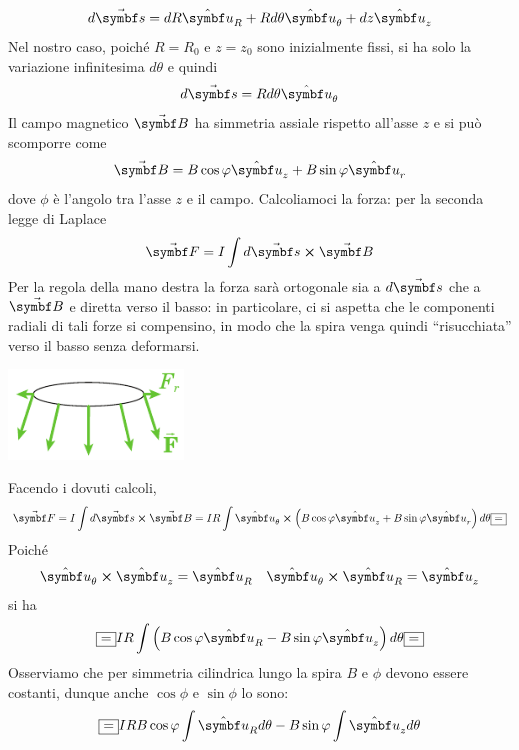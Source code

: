 \begin{equation}
	d\vba{s}=dR\vbh{u}_R+Rd\theta\vbh{u}_\theta+dz\vbh{u}_z
\end{equation}
Nel nostro caso, poiché $R=R_0$ e $z=z_0$ sono inizialmente fissi, si ha solo la variazione infinitesima $d\theta$ e quindi
\begin{equation}
	d\vba{s}=Rd\theta\vbh{u}_\theta
\end{equation}
Il campo magnetico $\vba{B}$ ha simmetria assiale rispetto all'asse $z$ e si può scomporre come
\begin{equation}
	\vba{B}=B\cos\phi\vbh{u}_z+B\sin\phi\vbh{u}_r
\end{equation}
dove $\phi$ è l'angolo tra l'asse $z$ e il campo. Calcoliamoci la forza: per la seconda legge di Laplace
\begin{equation*}
	\vba{F}=I\int d\vba{s}\cross\vba{B}
\end{equation*}
Per la regola della mano destra la forza sarà ortogonale sia a $d\vba{s}$ che a $\vba{B}$ e diretta verso il basso: in particolare, ci si aspetta che le componenti radiali di tali forze si compensino, in modo che la spira venga quindi ``risucchiata'' verso il basso senza deformarsi.
\begin{center}
	\includegraphics[width=0.35\textwidth]{images/chp8/chp8magnetecilindrico2.pdf}
\end{center}
Facendo i dovuti calcoli,
\begin{equation*}
	\vba{F}=I\int d\vba{s}\cross\vba{B}=IR\int\vbh{u}_{\theta}\cross\left(B\cos\phi\vbh{u}_z+B\sin\phi\vbh{u}_r\right)d\theta\squarequal
\end{equation*}
Poiché
\begin{align*}
	\vbh{u}_{\theta}\cross\vbh{u}_{z}=\vbh{u}_R&&
	\vbh{u}_{\theta}\cross\vbh{u}_{R}=\vbh{u}_z
\end{align*}
si ha
\begin{equation*}
	\squarequal IR\int \left(B\cos\phi\vbh{u}_R-B\sin\phi\vbh{u}_z\right)d\theta\squarequal
\end{equation*}
Osserviamo che per simmetria cilindrica lungo la spira $B$ e $\phi$ devono essere costanti, dunque anche $\cos\phi$ e $\sin\phi$ lo sono:
\begin{equation*}
	\squarequal IRB\cos\phi\int \vbh{u}_Rd\theta-B\sin\phi\int\vbh{u}_zd\theta
\end{equation*}
